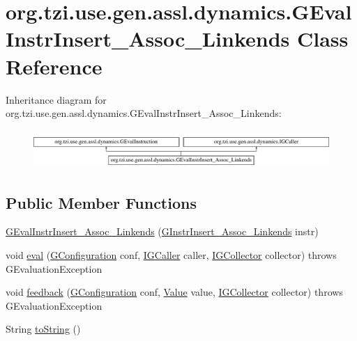 \hypertarget{classorg_1_1tzi_1_1use_1_1gen_1_1assl_1_1dynamics_1_1_g_eval_instr_insert___assoc___linkends}{\section{org.\-tzi.\-use.\-gen.\-assl.\-dynamics.\-G\-Eval\-Instr\-Insert\-\_\-\-Assoc\-\_\-\-Linkends Class Reference}
\label{classorg_1_1tzi_1_1use_1_1gen_1_1assl_1_1dynamics_1_1_g_eval_instr_insert___assoc___linkends}
}
Inheritance diagram for org.\-tzi.\-use.\-gen.\-assl.\-dynamics.\-G\-Eval\-Instr\-Insert\-\_\-\-Assoc\-\_\-\-Linkends\-:\begin{figure}[H]
\begin{center}
\leavevmode
\includegraphics[height=1.477572cm]{classorg_1_1tzi_1_1use_1_1gen_1_1assl_1_1dynamics_1_1_g_eval_instr_insert___assoc___linkends}
\end{center}
\end{figure}
\subsection*{Public Member Functions}
\begin{DoxyCompactItemize}
\item 
\hyperlink{classorg_1_1tzi_1_1use_1_1gen_1_1assl_1_1dynamics_1_1_g_eval_instr_insert___assoc___linkends_ab5d181c6423309f6293abaa373c185c0}{G\-Eval\-Instr\-Insert\-\_\-\-Assoc\-\_\-\-Linkends} (\hyperlink{classorg_1_1tzi_1_1use_1_1gen_1_1assl_1_1statics_1_1_g_instr_insert___assoc___linkends}{G\-Instr\-Insert\-\_\-\-Assoc\-\_\-\-Linkends} instr)
\item 
void \hyperlink{classorg_1_1tzi_1_1use_1_1gen_1_1assl_1_1dynamics_1_1_g_eval_instr_insert___assoc___linkends_a585c856caa4c673393398baf7fd0bf4a}{eval} (\hyperlink{classorg_1_1tzi_1_1use_1_1gen_1_1assl_1_1dynamics_1_1_g_configuration}{G\-Configuration} conf, \hyperlink{interfaceorg_1_1tzi_1_1use_1_1gen_1_1assl_1_1dynamics_1_1_i_g_caller}{I\-G\-Caller} caller, \hyperlink{interfaceorg_1_1tzi_1_1use_1_1gen_1_1assl_1_1dynamics_1_1_i_g_collector}{I\-G\-Collector} collector)  throws G\-Evaluation\-Exception 
\item 
void \hyperlink{classorg_1_1tzi_1_1use_1_1gen_1_1assl_1_1dynamics_1_1_g_eval_instr_insert___assoc___linkends_a2603d4e567a367419e95b64aa7f9f38d}{feedback} (\hyperlink{classorg_1_1tzi_1_1use_1_1gen_1_1assl_1_1dynamics_1_1_g_configuration}{G\-Configuration} conf, \hyperlink{classorg_1_1tzi_1_1use_1_1uml_1_1ocl_1_1value_1_1_value}{Value} value, \hyperlink{interfaceorg_1_1tzi_1_1use_1_1gen_1_1assl_1_1dynamics_1_1_i_g_collector}{I\-G\-Collector} collector)  throws G\-Evaluation\-Exception 
\item 
String \hyperlink{classorg_1_1tzi_1_1use_1_1gen_1_1assl_1_1dynamics_1_1_g_eval_instr_insert___assoc___linkends_a4591505ec28aad53c8edd72769f64058}{to\-String} ()
\end{DoxyCompactItemize}
